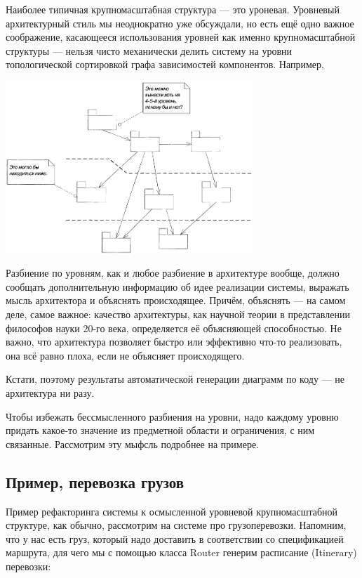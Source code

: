 \documentclass[a5paper]{article}
\begin{document}
Наиболее типичная крупномасштабная структура --- это уроневая. Уровневый архитектурный стиль мы неоднократно уже обсуждали, но есть ещё одно важное соображение, касающееся использования уровней как именно крупномасштабной структуры --- нельзя чисто механически делить систему на уровни топологической сортировкой графа зависимостей компонентов. Например,

\begin{center}
    \includegraphics[width=0.7\textwidth]{meaninglessLayers.png}
\end{center}

Разбиение по уровням, как и любое разбиение в архитектуре вообще, должно сообщать дополнительную информацию об идее реализации системы, выражать мысль архитектора и объяснять происходящее. Причём, объяснять --- на самом деле, самое важное: качество архитектуры, как научной теории в представлении философов науки 20-го века, определяется её объясняющей способностью. Не важно, что архитектура позволяет быстро или эффективно что-то реализовать, она всё равно плоха, если не объясняет происходящего.

Кстати, поэтому результаты автоматической генерации диаграмм по коду --- не архитектура ни разу.

Чтобы избежать бессмысленного разбиения на уровни, надо каждому уровню придать какое-то значение из предметной области и ограничения, с ним связанные. Рассмотрим эту мыфсль подробнее на примере.

\subsection{Пример, перевозка грузов}

Пример рефакторинга системы к осмысленной уровневой крупномасштабной структуре, как обычно, рассмотрим на системе про грузоперевозки. Напомним, что у нас есть груз, который надо доставить в соответствии со спецификацией маршрута, для чего мы с помощью класса Router генерим расписание (Itinerary) перевозки:
\end{document}
